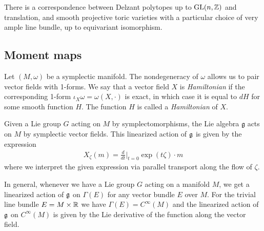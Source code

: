 \begin{theorem}
    There is a correspondence between Delzant polytopes up to $\operatorname{GL}(n,\mathbb{Z})$
    and translation, and smooth projective toric varieties with a particular choice
    of very ample line bundle, up to equivariant isomorphism.
\end{theorem}

\subsection{Moment maps}
Let $(M,\omega)$ be a symplectic manifold. The nondegeneracy of $\omega$ allows us to
pair vector fields with 1-forms. We say that a vector field $X$ is \emph{Hamiltonian} if
the corresponding 1-form $\iota_X\omega = \omega(X,\cdot)$ is exact, in which case 
it is equal to $dH$ for some smooth function $H$. The function $H$ is called a
\emph{Hamiltonian} of $X$. 

Given a Lie group $G$ acting on $M$ by symplectomorphisms,
the Lie algebra $\mathfrak{g}$ acts on $M$ by symplectic vector fields.
This linearized action of $\mathfrak{g}$ is given by the expression
\begin{align*}
    X_\zeta(m) = \frac{d}{dt}\Big|_{t=0} \exp(t\zeta)\cdot m
\end{align*} where we interpret the given expression via parallel transport along the flow of $\zeta$.

\begin{remark}
    In general, whenever we have a Lie group $G$ acting on a manifold $M$, we get a linearized
    action of $\mathfrak{g}$ on $\Gamma(E)$ for any vector bundle $E$ over $M$. For the trivial 
    line bundle $E = M\times \mathbb{R}$ we have $\Gamma(E) = C^\infty(M)$ and the linearized action
    of $\mathfrak{g}$ on $C^\infty(M)$ is given by the Lie derivative of 
    the function along the vector field.
\end{remark}

